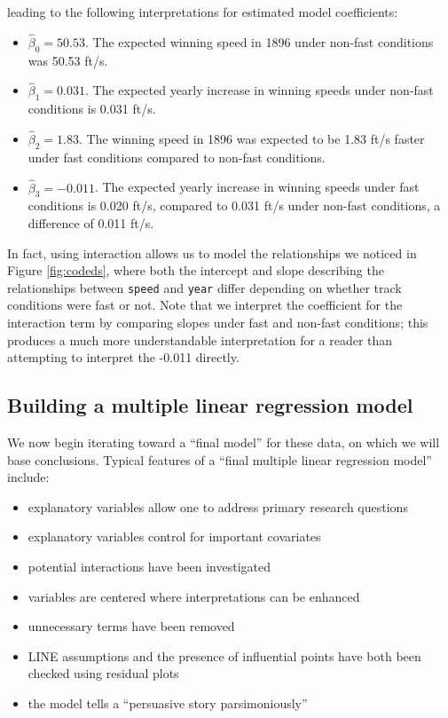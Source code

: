 \documentclass[
]{krantz}
\providecommand{\tightlist}{%
  \setlength{\itemsep}{0pt}\setlength{\parskip}{0pt}}
\begin{document}
leading to the following interpretations for estimated model coefficients:

\begin{itemize}
\tightlist
\item
  \(\hat{\beta}_{0} = 50.53\). The expected winning speed in 1896 under non-fast conditions was 50.53 ft/s.
\item
  \(\hat{\beta}_{1} = 0.031\). The expected yearly increase in winning speeds under non-fast conditions is 0.031 ft/s.
\item
  \(\hat{\beta}_{2} = 1.83\). The winning speed in 1896 was expected to be 1.83 ft/s faster under fast conditions compared to non-fast conditions.
\item
  \(\hat{\beta}_{3} = -0.011\). The expected yearly increase in winning speeds under fast conditions is 0.020 ft/s, compared to 0.031 ft/s under non-fast conditions, a difference of 0.011 ft/s.
\end{itemize}

In fact, using interaction allows us to model the relationships we noticed in Figure \ref{fig:codeds}, where both the intercept and slope describing the relationships between \texttt{speed} and \texttt{year} differ depending on whether track conditions were fast or not. Note that we interpret the coefficient for the interaction term by comparing slopes under fast and non-fast conditions; this produces a much more understandable interpretation for a reader than attempting to interpret the -0.011 directly.

\hypertarget{multreg_build}{%
\subsection{Building a multiple linear regression model}\label{multreg_build}}

We now begin iterating toward a ``final model'' for these data, on which we will base conclusions. Typical features of a ``final multiple linear regression model'' include:

\begin{itemize}
\tightlist
\item
  explanatory variables allow one to address primary research questions
\item
  explanatory variables control for important covariates
\item
  potential interactions have been investigated
\item
  variables are centered where interpretations can be enhanced
\item
  unnecessary terms have been removed
\item
  LINE assumptions and the presence of influential points have both been checked using residual plots
\item
  the model tells a ``persuasive story parsimoniously''
\end{itemize}
\end{document}
